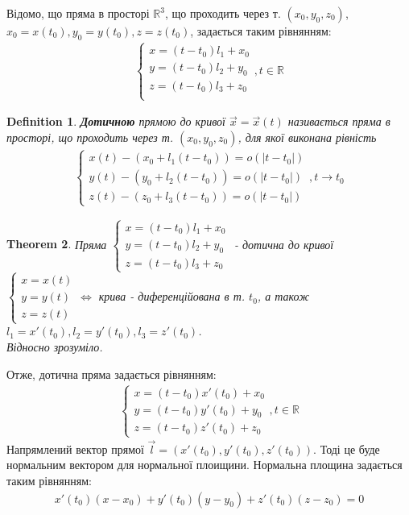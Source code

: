 \documentclass[a4paper, 10pt]{article}
\theoremstyle{theoremdd}
\newtheorem{theorem}{Theorem}[subsection]
\theoremstyle{theoremdd}
\theoremstyle{theoremdd}
\newtheorem{definition}[theorem]{Definition}
\theoremstyle{theoremdd}
\theoremstyle{theoremdd}
\theoremstyle{theoremdd}
\theoremstyle{theoremdd}
\theoremstyle{theoremdd}
\theoremstyle{theoremdd}
\begin{document}
Відомо, що пряма в просторі $\mathbb{R}^3$, що проходить через т. $(x_0,y_0,z_0)$, $x_0 = x(t_0), y_0 = y(t_0), z = z(t_0)$, задається таким рівнянням:
\begin{align*}
\begin{cases}
x = (t-t_0) l_1 + x_0 \\
y = (t-t_0) l_2 + y_0 \\
z = (t-t_0) l_3 + z_0 \\
\end{cases}, t \in \mathbb{R}
\end{align*}

\begin{definition}
\textbf{Дотичною} прямою до кривої $\vec{x} = \vec{x}(t)$ називається пряма в просторі, що проходить через т. $(x_0,y_0,z_0)$, для якої виконана рівність
\begin{align*}
\begin{cases}
x(t) - (x_0 + l_1(t-t_0)) = o(|t-t_0|) \\
y(t) - (y_0 + l_2(t-t_0)) = o(|t-t_0|) \\
z(t) - (z_0 + l_3(t-t_0)) = o(|t-t_0|)
\end{cases}, t \to t_0
\end{align*}
\end{definition}

\begin{theorem}
Пряма $\begin{cases} x = (t-t_0)l_1 + x_0 \\ y = (t-t_0)l_2 + y_0 \\ z = (t-t_0)l_3 + z_0 \end{cases}$ - дотична до кривої $\begin{cases} x = x(t) \\ y = y(t) \\ z = z(t) \end{cases} \iff$ крива - диференційована в т. $t_0$, а також $l_1 = x'(t_0), l_2 = y'(t_0), l_3 = z'(t_0)$.\\
\textit{Відносно зрозуміло.}
\end{theorem}
Отже, дотична пряма задається рівнянням:
\begin{align*}
\begin{cases}
x=(t-t_0) x'(t_0)+x_0 \\
y=(t-t_0) y'(t_0)+y_0\\
z=(t-t_0) z'(t_0)+z_0
\end{cases}, t \in \mathbb{R}
\end{align*}
Напрямлений вектор прямої $\vec{l} = (x'(t_0),y'(t_0),z'(t_0))$. Тоді це буде нормальним вектором для нормальної плоищини. Нормальна площина задається таким рівнянням:
\begin{align*}
x'(t_0)(x-x_0) + y'(t_0)(y-y_0) + z'(t_0)(z-z_0) = 0
\end{align*}
\end{document}

